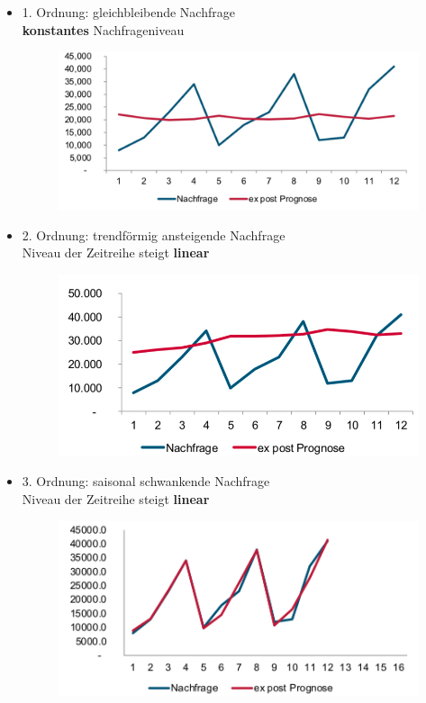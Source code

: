 \documentclass[12pt, letterpaper]{article}
\begin{document}
\begin{CJK*}{UTF8}{gbsn}
\begin{itemize}
\item 1. Ordnung: gleichbleibende Nachfrage\\
\textbf{konstantes} Nachfrageniveau\\

\begin{figure}[h!]
  \centering %
  \includegraphics[width=0.5\linewidth]{UE11.jpg}\\[5cm]
\end{figure}

\item 2. Ordnung: trendförmig ansteigende Nachfrage\\
Niveau der Zeitreihe steigt \textbf{linear}\\

\begin{figure}[h!]
  \centering %
  \includegraphics[width=0.5\linewidth]{UE12.jpg}
\end{figure}

\item 3. Ordnung: saisonal schwankende Nachfrage\\
Niveau der Zeitreihe steigt \textbf{linear}\\

\begin{figure}[h!]
  \centering %
  \includegraphics[width=0.5\linewidth]{UE13.jpg}
\end{figure}

\end{itemize}


\end{CJK*}
\end{document}
